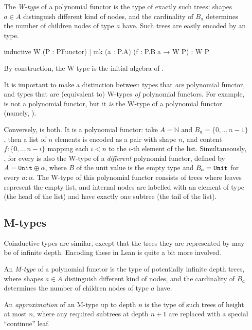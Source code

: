 The \emph{W-type} of a polynomial functor  is the type of exactly such trees: shapes $a ∈ A$ distinguish different kind of nodes, and the cardinality of $B_a$ determines the number of children nodes of type $a$ have. Such trees are easily encoded by an \inductive{} type.

\begin{leancode}
    inductive W (P : PFunctor)
    | mk (a : P.A) (f : P.B a → W P) : W P
\end{leancode}

By construction, the W-type is the initial algebra of .

It is important to make a distinction between types that \emph{are} polynomial functor, and types that are (equivalent to) W-types \emph{of} polynomial functors. 
For example,  is not a polynomial functor, but it \emph{is} the W-type of a polynomial functor (namely, ). 

Conversely,  is both. It is a polynomial functor: take $A = \mathbb{N}$ and $B_n = \{0,..,n-1\}$, then a list of $n$ elements is encoded as a pair with shape $n$, and content $f : \{0,..,n-i\}$ mapping each $i < n$ to the $i$-th element of the list. 
Simultaneously, , for every  is also the W-type of a \emph{different} polynomial functor, defined by $A = \texttt{Unit} ⊕ α$, where $B$ of the unit value is the empty type and $B_a = \lean{Unit}$ for every $a : α$. The W-type of this polynomial functor consists of trees where leaves represent the empty list, and internal nodes are labelled with an element of type  (the head of the list) and have exactly one subtree (the tail of the list).

\subsection*{M-types}
Coinductive types are similar, except that the trees they are represented by may be of infinite depth. Encoding these in Lean is quite a bit more involved.

An \emph{M-type} of a polynomial functor  is the type of potentially infinite depth trees, where shapes $a ∈ A$ distinguish different kind of nodes, and the cardinality of $B_a$ determines the number of children nodes of type $a$ have.

An \emph{approximation} of an M-type up to depth $n$ is the type of such trees of height at most $n$, where any required subtrees at depth $n+1$ are replaced with a special ``continue'' leaf. 

